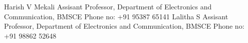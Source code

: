 \begin{cvhonors}
  \cvhonor
    {Harish V Mekali}
    {Assisant Professor, Department of Electronics and Communication, BMSCE \newline Phone no: +91 95387 65141}
    {}
    {}
     \cvhonor
    {Lalitha S}
    {Assisant Professor, Department of Electronics and Communication, BMSCE \newline Phone no: +91 98862 52648}
    {}
    {}
    
\end{cvhonors}
